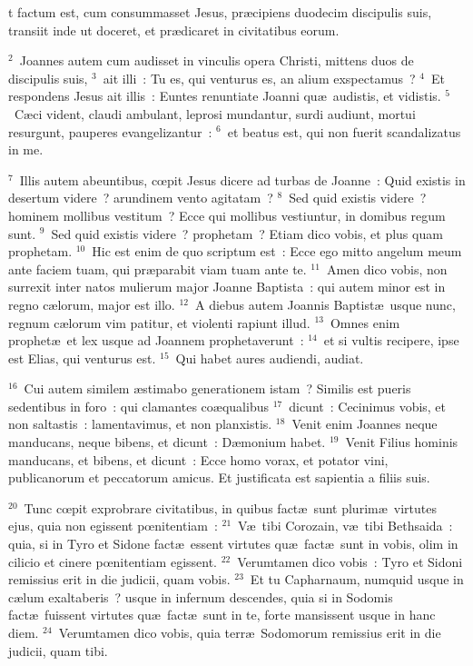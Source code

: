 \bchapter
{}t factum est, cum consummasset Jesus, pr\ae cipiens duodecim discipulis suis, transiit inde ut doceret, et pr\ae dicaret in civitatibus eorum.


${}^{2}$~Joannes autem cum audisset in vinculis opera Christi, mittens duos de discipulis suis,
${}^{3}$~ait illi~: Tu es, qui venturus es, an alium exspectamus~?
${}^{4}$~Et respondens Jesus ait illis~: Euntes renuntiate Joanni qu\ae\ audistis, et vidistis.
${}^{5}$~C\ae ci vident, claudi ambulant, leprosi mundantur, surdi audiunt, mortui resurgunt, pauperes evangelizantur~:
${}^{6}$~et beatus est, qui non fuerit scandalizatus in me.


${}^{7}$~Illis autem abeuntibus, cœpit Jesus dicere ad turbas de Joanne~: Quid existis in desertum videre~? arundinem vento agitatam~?
${}^{8}$~Sed quid existis videre~? hominem mollibus vestitum~? Ecce qui mollibus vestiuntur, in domibus regum sunt.
${}^{9}$~Sed quid existis videre~? prophetam~? Etiam dico vobis, et plus quam prophetam.
${}^{10}$~Hic est enim de quo scriptum est~: Ecce ego mitto angelum meum ante faciem tuam, qui pr\ae parabit viam tuam ante te.
${}^{11}$~Amen dico vobis, non surrexit inter natos mulierum major Joanne Baptista~: qui autem minor est in regno c\ae lorum, major est illo.
${}^{12}$~A diebus autem Joannis Baptist\ae\ usque nunc, regnum c\ae lorum vim patitur, et violenti rapiunt illud.
${}^{13}$~Omnes enim prophet\ae\ et lex usque ad Joannem prophetaverunt~:
${}^{14}$~et si vultis recipere, ipse est Elias, qui venturus est.
${}^{15}$~Qui habet aures audiendi, audiat.


${}^{16}$~Cui autem similem \ae stimabo generationem istam~? Similis est pueris sedentibus in foro~: qui clamantes co\ae qualibus
${}^{17}$~dicunt~: Cecinimus vobis, et non saltastis~: lamentavimus, et non planxistis.
${}^{18}$~Venit enim Joannes neque manducans, neque bibens, et dicunt~: D\ae monium habet.
${}^{19}$~Venit Filius hominis manducans, et bibens, et dicunt~: Ecce homo vorax, et potator vini, publicanorum et peccatorum amicus. Et justificata est sapientia a filiis suis.


${}^{20}$~Tunc cœpit exprobrare civitatibus, in quibus fact\ae\ sunt plurim\ae\ virtutes ejus, quia non egissent pœnitentiam~:
${}^{21}$~V\ae\ tibi Corozain, v\ae\ tibi Bethsaida~: quia, si in Tyro et Sidone fact\ae\ essent virtutes qu\ae\ fact\ae\ sunt in vobis, olim in cilicio et cinere pœnitentiam egissent.
${}^{22}$~Verumtamen dico vobis~: Tyro et Sidoni remissius erit in die judicii, quam vobis.
${}^{23}$~Et tu Capharnaum, numquid usque in c\ae lum exaltaberis~? usque in infernum descendes, quia si in Sodomis fact\ae\ fuissent virtutes qu\ae\ fact\ae\ sunt in te, forte mansissent usque in hanc diem.
${}^{24}$~Verumtamen dico vobis, quia terr\ae\ Sodomorum remissius erit in die judicii, quam tibi.


